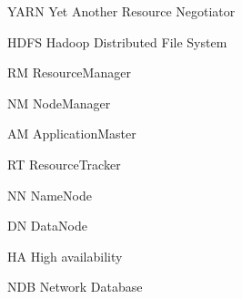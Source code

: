 \begin{basedescript}{\desclabelstyle{\pushlabel}\desclabelwidth{10em}}
\item[YARN] Yet Another Resource Negotiator
  \cite{Vavilapalli:2013:AHY:2523616.2523633}
\item[HDFS] Hadoop Distributed File System \cite{hdfs}
\item[RM] ResourceManager
\item[NM] NodeManager
\item[AM] ApplicationMaster
\item[RT] ResourceTracker
\item[NN] NameNode
\item[DN] DataNode
\item[HA] High availability
\item[NDB] Network Database
\end{basedescript}